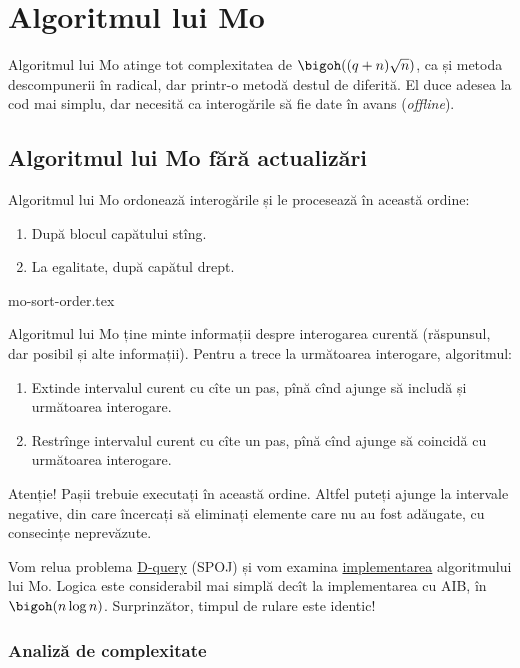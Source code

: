 \chapter{Algoritmul lui Mo}
\label{chapter:mo}

Algoritmul lui Mo atinge tot complexitatea de $\bigoh((q + n) \sqrt {n})$, ca și metoda descompunerii în radical, dar printr-o metodă destul de diferită. El duce adesea la cod mai simplu, dar necesită ca interogările să fie date în avans (\textit{offline}).

\section{Algoritmul lui Mo fără actualizări}

Algoritmul lui Mo ordonează interogările și le procesează în această ordine:

\begin{enumerate}
  \item După blocul capătului stîng.
  \item La egalitate, după capătul drept.
\end{enumerate}

{mo-sort-order.tex}

Algoritmul lui Mo ține minte informații despre interogarea curentă (răspunsul, dar posibil și alte informații). Pentru a trece la următoarea interogare, algoritmul:

\begin{enumerate}
  \item Extinde intervalul curent cu cîte un pas, pînă cînd ajunge să includă și următoarea interogare.
  \item Restrînge intervalul curent cu cîte un pas, pînă cînd ajunge să coincidă cu următoarea interogare.
\end{enumerate}

Atenție! Pașii trebuie executați în această ordine. Altfel puteți ajunge la intervale negative, din care încercați să eliminați elemente care nu au fost adăugate, cu consecințe neprevăzute.

Vom relua problema \href{https://www.spoj.com/problems/DQUERY/}{D-query} (SPOJ) și vom examina \href{https://github.com/CatalinFrancu/nerdvana/blob/main/problems/spoj/dquery/cata-mo.cpp}{implementarea} algoritmului lui Mo. Logica este considerabil mai simplă decît la implementarea cu AIB, în $\bigoh(n \log n)$. Surprinzător, timpul de rulare este identic!

\subsection{Analiză de complexitate}

